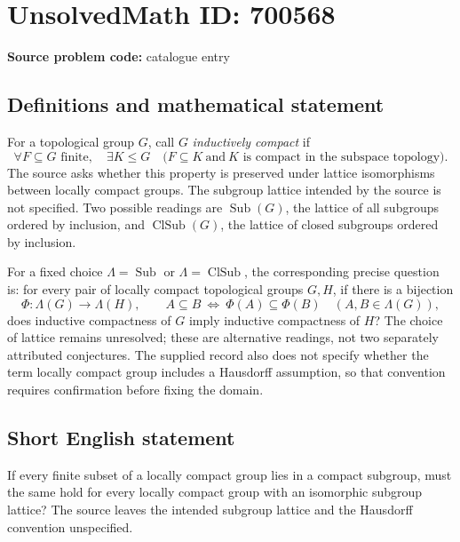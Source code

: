 \documentclass[11pt]{article}
\begin{document}
\section*{UnsolvedMath ID: 700568}
\textbf{Source problem code:} catalogue entry
\subsection{Definitions and mathematical statement}
For a topological group \(G\), call \(G\) \emph{inductively compact} if
\[
\forall F\subseteq G\text{ finite},\quad \exists K\leq G\quad \bigl(F\subseteq K\ \text{and}\ K\text{ is compact in the subspace topology}\bigr).
\]
The source asks whether this property is preserved under lattice isomorphisms between locally compact groups. The subgroup lattice intended by the source is not specified. Two possible readings are \(\operatorname{Sub}(G)\), the lattice of all subgroups ordered by inclusion, and \(\operatorname{ClSub}(G)\), the lattice of closed subgroups ordered by inclusion.

For a fixed choice \(\Lambda=\operatorname{Sub}\) or \(\Lambda=\operatorname{ClSub}\), the corresponding precise question is: for every pair of locally compact topological groups \(G,H\), if there is a bijection
\[
\Phi:\Lambda(G)\longrightarrow\Lambda(H),\qquad
A\subseteq B\ \Longleftrightarrow\ \Phi(A)\subseteq\Phi(B)
\quad(A,B\in\Lambda(G)),
\]
does inductive compactness of \(G\) imply inductive compactness of \(H\)? The choice of lattice remains unresolved; these are alternative readings, not two separately attributed conjectures. The supplied record also does not specify whether the term locally compact group includes a Hausdorff assumption, so that convention requires confirmation before fixing the domain.
\subsection{Short English statement}
If every finite subset of a locally compact group lies in a compact subgroup, must the same hold for every locally compact group with an isomorphic subgroup lattice? The source leaves the intended subgroup lattice and the Hausdorff convention unspecified.
\end{document}
